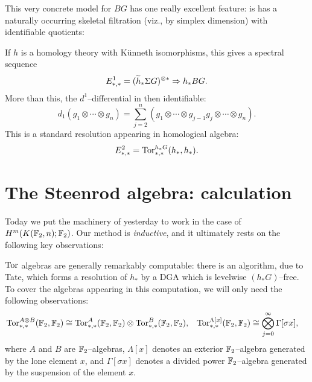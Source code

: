 This very concrete model for $BG$ has one really excellent feature: is has a naturally occurring skeletal filtration (viz., by simplex dimension) with identifiable quotients:

\begin{figure*}
\begin{center}
\end{center}
\end{figure*}

If $h$ is a homology theory with K\"unneth isomorphisms, this gives a spectral sequence \[E^1_{*, *} = (\widetilde h_* \Sigma G)^{\otimes *} \Rightarrow h_* BG.\]  More than this, the $d^1$--differential in then identifiable: \[d_1(g_1 \otimes \cdots \otimes g_n) = \sum_{j=2}^n (g_1 \otimes \cdots \otimes g_{j-1} g_j \otimes \cdots \otimes g_n).\]  This is a standard resolution appearing in homological algebra:
\[E_{*, *}^2 = \operatorname{Tor}^{h_* G}_{*, *}(h_*, h_*).\]




\section{The Steenrod algebra: calculation}

Today we put the machinery of yesterday to work in the case of $H^m(K(\mathbb F_2, n); \mathbb F_2)$.
Our method is \emph{inductive}, and it ultimately rests on the following key observations:

\begin{example}
$\operatorname{Tor}$ algebras are generally remarkably computable: there is an algorithm, due to Tate, which forms a resolution of $h_*$ by a DGA which is levelwise $(h_* G)$--free.
To cover the algebras appearing in this computation, we will only need the following observations:
\begin{align*}
\operatorname{Tor}^{A \otimes B}_{*, *}(\mathbb F_2, \mathbb F_2) & \cong \operatorname{Tor}^A_{*, *}(\mathbb F_2, \mathbb F_2) \otimes \operatorname{Tor}^B_{*, *}(\mathbb F_2, \mathbb F_2), &
\operatorname{Tor}^{\Lambda[x]}_{*, *}(\mathbb F_2, \mathbb F_2) & \cong \bigotimes_{j=0}^\infty \Gamma[\sigma x],
\end{align*}
where $A$ and $B$ are $\mathbb F_2$--algebras, $\Lambda[x]$ denotes an exterior $\mathbb F_2$--algebra generated by the lone element $x$, and $\Gamma[\sigma x]$ denotes a divided power $\mathbb F_2$--algebra generated by the suspension of the element $x$.
\end{example}

